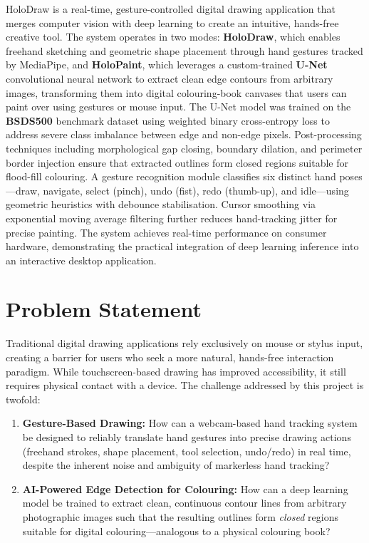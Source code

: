 \documentclass[12pt, a4paper]{article}
\begin{document}
HoloDraw is a real-time, gesture-controlled digital drawing application that merges computer vision with deep learning to create an intuitive, hands-free creative tool.
The system operates in two modes: \textbf{HoloDraw}, which enables freehand sketching and geometric shape placement through hand gestures tracked by MediaPipe, and \textbf{HoloPaint}, which leverages a custom-trained \textbf{U-Net} convolutional neural network to extract clean edge contours from arbitrary images, transforming them into digital colouring-book canvases that users can paint over using gestures or mouse input.
The U-Net model was trained on the \textbf{BSDS500} benchmark dataset using weighted binary cross-entropy loss to address severe class imbalance between edge and non-edge pixels.
Post-processing techniques including morphological gap closing, boundary dilation, and perimeter border injection ensure that extracted outlines form closed regions suitable for flood-fill colouring.
A gesture recognition module classifies six distinct hand poses—draw, navigate, select (pinch), undo (fist), redo (thumb-up), and idle—using geometric heuristics with debounce stabilisation.
Cursor smoothing via exponential moving average filtering further reduces hand-tracking jitter for precise painting.
The system achieves real-time performance on consumer hardware, demonstrating the practical integration of deep learning inference into an interactive desktop application.

\section{Problem Statement}

Traditional digital drawing applications rely exclusively on mouse or stylus input, creating a barrier for users who seek a more natural, hands-free interaction paradigm.
While touchscreen-based drawing has improved accessibility, it still requires physical contact with a device.
The challenge addressed by this project is twofold:

\begin{enumerate}[label=\arabic*.]
    \item \textbf{Gesture-Based Drawing:}
    How can a webcam-based hand tracking system be designed to reliably translate hand gestures into precise drawing actions (freehand strokes, shape placement, tool selection, undo/redo) in real time, despite the inherent noise and ambiguity of markerless hand tracking?

    \item \textbf{AI-Powered Edge Detection for Colouring:}
    How can a deep learning model be trained to extract clean, continuous contour lines from arbitrary photographic images such that the resulting outlines form \emph{closed} regions suitable for digital colouring—analogous to a physical colouring book?
\end{enumerate}
\end{document}
